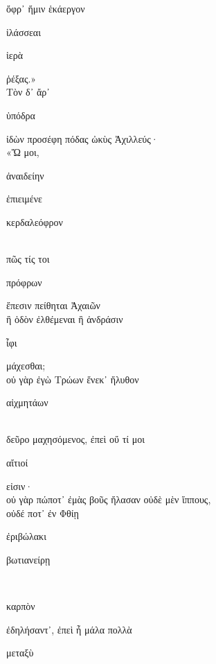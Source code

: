 \documentclass{ransom}
\begin{document}
\renewcommand{\rightheaderwhat}{\rightheaderwhatglosses}%
\begin{foreignpage}
\begin{graytext}
ὄφρ᾽ ἥμιν ἑκάεργον \begin{whitetext}ἱλάσσεαι\end{whitetext} \begin{whitetext}ἱερὰ\end{whitetext} ῥέξας.»\\
Τὸν δ᾽ ἄρ᾽ \begin{whitetext}ὑπόδρα\end{whitetext} ἰδὼν προσέφη πόδας ὠκὺς Ἀχιλλεύς·\\
«Ὤ μοι, \begin{whitetext}ἀναιδείην\end{whitetext} \begin{whitetext}ἐπιειμένε\end{whitetext} \begin{whitetext}κερδαλεόφρον\end{whitetext}\\
πῶς τίς τοι \begin{whitetext}πρόφρων\end{whitetext} ἔπεσιν πείθηται Ἀχαιῶν\hfill{}\\
ἢ ὁδὸν ἐλθέμεναι ἢ ἀνδράσιν \begin{whitetext}ἶφι\end{whitetext} μάχεσθαι;\\
οὐ γὰρ ἐγὼ Τρώων ἕνεκ᾽ ἤλυθον \begin{whitetext}αἰχμητάων\end{whitetext}\\
δεῦρο μαχησόμενος, ἐπεὶ οὔ τί μοι \begin{whitetext}αἴτιοί\end{whitetext} εἰσιν·\\
οὐ γὰρ πώποτ᾽ ἐμὰς βοῦς ἤλασαν οὐδὲ μὲν ἵππους,\\
οὐδέ ποτ᾽ ἐν Φθίῃ \begin{whitetext}ἐριβώλακι\end{whitetext} \begin{whitetext}βωτιανείρῃ\end{whitetext}\hfill{}\\
\begin{whitetext}καρπὸν\end{whitetext} ἐδηλήσαντ᾽, ἐπεὶ ἦ μάλα πολλὰ \begin{whitetext}μεταξὺ\end{whitetext}\\

\end{graytext}
\end{foreignpage}
\end{document}
